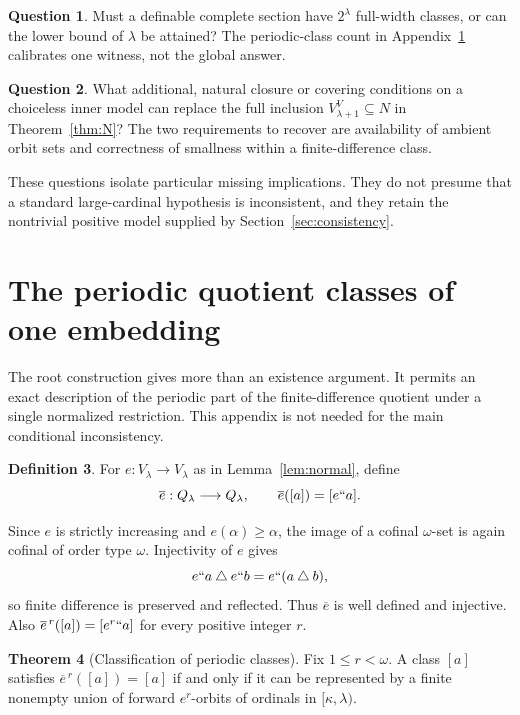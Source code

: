 \documentclass[11pt,letterpaper]{article}
\theoremstyle{definition}
\newtheorem{definition}{Definition}[section]
\newtheorem{theorem}[definition]{Theorem}
\newtheorem{question}[definition]{Question}
\numberwithin{equation}{section}
\newcommand{\symdiff}{\mathbin{\triangle}}
\newcommand{\ov}[1]{\overline{#1}}
\begin{document}
\begin{question}
Must a definable complete section have $2^\lambda$ full-width classes, or can the lower bound of $\lambda$ be attained? The periodic-class count in Appendix~\ref{app:orbits} calibrates one witness, not the global answer.
\end{question}

\begin{question}
What additional, natural closure or covering conditions on a choiceless inner model can replace the full inclusion $V_{\lambda+1}^V\subseteq N$ in Theorem~\ref{thm:N}? The two requirements to recover are availability of ambient orbit sets and correctness of smallness within a finite-difference class.
\end{question}

These questions isolate particular missing implications. They do not presume that a standard large-cardinal hypothesis is inconsistent, and they retain the nontrivial positive model supplied by Section~\ref{sec:consistency}.

\appendix
\section{The periodic quotient classes of one embedding}\label{app:orbits}

The root construction gives more than an existence argument. It permits an exact description of the periodic part of the finite-difference quotient under a single normalized restriction. This appendix is not needed for the main conditional inconsistency.

\begin{definition}
For $e:V_\lambda\to V_\lambda$ as in Lemma~\ref{lem:normal}, define
\[
       \ov e:Q_\lambda\longrightarrow Q_\lambda,
              \qquad\ov e([a])=[e``a].
\]
\end{definition}

Since $e$ is strictly increasing and $e(\alpha)\ge\alpha$, the image of a cofinal $\omega$-set is again cofinal of order type $\omega$. Injectivity of $e$ gives
\[
 e``a\symdiff e``b=e``(a\symdiff b),
\]
so finite difference is preserved and reflected. Thus $\ov e$ is well defined and injective. Also $\ov e^{\,r}([a])=[e^r``a]$ for every positive integer $r$.

\begin{theorem}[Classification of periodic classes]\label{thm:periodic}
Fix $1\le r<\omega$. A class $[a]$ satisfies $\ov e^{\,r}([a])=[a]$ if and only if it can be represented by a finite nonempty union of forward $e^r$-orbits of ordinals in $[\kappa,\lambda)$.
\end{theorem}
\end{document}
